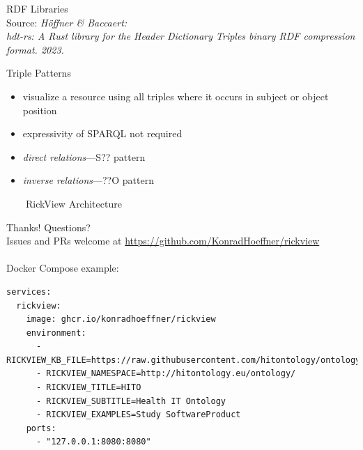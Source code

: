 \documentclass[14pt,aspectratio=169]{beamer}
\newcommand{\imageslide}[4][]
{
\begin{frame}[plain]{~~~~#2}
\vspace{0.2em}
\centering\makebox[\linewidth]{\texttt{[image: \#3]}}
\\#1
\note{#4}
\end{frame}
}
\begin{document}
\begin{frame}[plain]{RDF Libraries}
\centering
{}\\
\scriptsize Source: \emph{Höffner \& Baccaert:\\hdt-rs: A Rust library for the Header Dictionary Triples binary RDF compression format. 2023.}
\end{frame}

\begin{frame}{Triple Patterns}
\begin{itemize}
\item visualize a resource using all triples where it occurs in subject or object position
\item expressivity of SPARQL not required
\item \emph{direct relations}---S?? pattern
\item \emph{inverse relations}---??O pattern
\end{itemize}
\end{frame}

\imageslide{RickView Architecture}{img/architecture-rickview.pdf}{}

\begin{frame}[fragile]{Thanks! Questions?}
~\\
Issues and PRs welcome at \url{https://github.com/KonradHoeffner/rickview}\\
~\\
Docker Compose example:
\scriptsize
\begin{verbatim}
services:
  rickview:
    image: ghcr.io/konradhoeffner/rickview
    environment:
      - RICKVIEW_KB_FILE=https://raw.githubusercontent.com/hitontology/ontology/dist/all.ttl
      - RICKVIEW_NAMESPACE=http://hitontology.eu/ontology/
      - RICKVIEW_TITLE=HITO
      - RICKVIEW_SUBTITLE=Health IT Ontology
      - RICKVIEW_EXAMPLES=Study SoftwareProduct
    ports:
      - "127.0.0.1:8080:8080"
\end{verbatim}
\end{frame}
\end{document}
